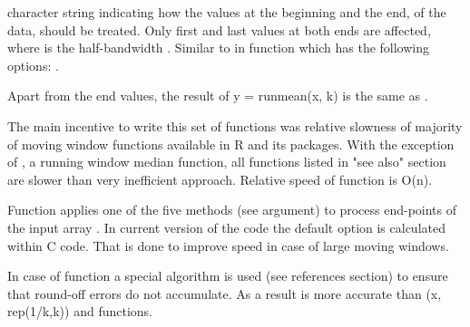 \begin{Arguments}
\begin{ldescription}
\item[\code{endrule}] character string indicating how the values at the beginning 
and the end, of the data, should be treated. Only first and last  
values at both ends are affected, where  is the half-bandwidth 
.
Similar to  in  function which has the 
following options:  .

\end{ldescription}
\end{Arguments}
\begin{Details}\relax
Apart from the end values, the result of y = runmean(x, k) is the same as 
.

The main incentive to write this set of functions was relative slowness of 
majority of moving window functions available in R and its packages.  With the 
exception of , a running window median function, all 
functions listed in "see also" section are slower than very inefficient 
 approach. Relative 
speed of  function is O(n).

Function  applies one of the five methods (see  
argument) to process end-points of the input array . In current 
version of the code the default  option is calculated 
within C code. That is done to improve speed in case of large moving windows.

In case of  function a special algorithm is 
used (see references section) to ensure that round-off errors do not 
accumulate. As a result  is more accurate than 
(x, rep(1/k,k)) and  
functions.
\end{Details}
